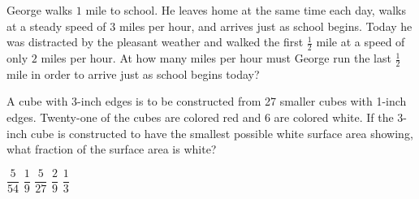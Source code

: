 \documentclass[12pt]{exam}
\begin{document}
\begin{questions}
\begin{center}
\end{center}

\begin{oneparchoices}
\end{oneparchoices}
\answerline

\question 
George walks $1$ mile to school. He leaves home at the same time each day, walks at a steady speed of $3$ miles per hour, and arrives just as school begins. Today he was distracted by the pleasant weather and walked the first $\frac{1}{2}$ mile at a speed of only $2$ miles per hour. At how many miles per hour must George run the last $\frac{1}{2}$ mile in order to arrive just as school begins today?

\begin{oneparchoices}
\end{oneparchoices}
\answerline

\question 
A cube with 3-inch edges is to be constructed from 27 smaller cubes with 1-inch edges. Twenty-one of the cubes are colored red and 6 are colored white. If the 3-inch cube is constructed to have the smallest possible white surface area showing, what fraction of the surface area is white?

\begin{oneparchoices}
\choice	$\dfrac{5}{54}$
\choice $\dfrac{1}{9}$
\choice $\dfrac{5}{27}$
\choice $\dfrac{2}{9}$
\choice $\dfrac{1}{3}$
\end{oneparchoices}
\answerline
\end{questions}
\end{document}
